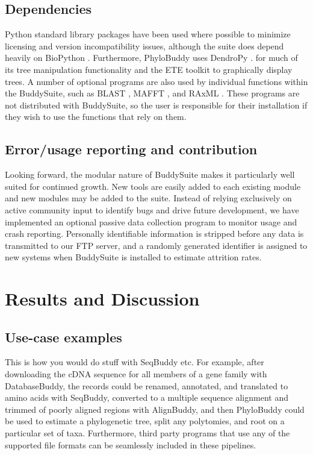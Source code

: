 \documentclass[twocolumn]{bmcart}%
\begin{document}
\subsection*{Dependencies}
Python standard library packages have been used where possible to minimize licensing and version incompatibility issues, although the suite does depend heavily on BioPython \cite{Cock:2009hj}. Furthermore, PhyloBuddy uses DendroPy \cite{Sukumaran:2010id}. for much of its tree manipulation functionality and the ETE toolkit \cite{HuertaCepas:2010fd} to graphically display trees. A number of optional programs are also used by individual functions within the BuddySuite, such as BLAST \cite{Camacho2009}, MAFFT \cite{Katoh:2013hm}, and RAxML \cite{Stamatakis:2006de}. These programs are not distributed with BuddySuite, so the user is responsible for their installation if they wish to use the functions that rely on them.

\subsection*{Error/usage reporting and contribution}
Looking forward, the modular nature of BuddySuite makes it particularly well suited for continued growth. New tools are easily added to each existing module and new modules may be added to the suite. Instead of relying exclusively on active community input to identify bugs and drive future development, we have implemented an optional passive data collection program to monitor usage and crash reporting. Personally identifiable information is stripped before any data is transmitted to our FTP server, and a randomly generated identifier is assigned to new systems when BuddySuite is installed to estimate attrition rates.

\section*{Results and Discussion}
\subsection*{Use-case examples}
This is how you would do stuff with SeqBuddy etc.
For example, after downloading the cDNA sequence for all members of a gene family with DatabaseBuddy, the records could be renamed, annotated, and translated to amino acids with SeqBuddy, converted to a multiple sequence alignment and trimmed of poorly aligned regions with AlignBuddy, and then PhyloBuddy could be used to estimate a phylogenetic tree, split any polytomies, and root on a particular set of taxa. Furthermore, third party programs that use any of the supported file formats can be seamlessly included in these pipelines.
\end{document}

